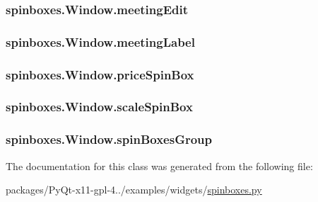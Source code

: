 \subsubsection[{meeting\+Edit}]{\setlength{\rightskip}{0pt plus 5cm}spinboxes.\+Window.\+meeting\+Edit}\label{classspinboxes_1_1Window_a54ce7dc97045e27e06d113a56c515d79}
\hypertarget{classspinboxes_1_1Window_af187cb704e7fd78f2927aeb3847082ae}{}
\subsubsection[{meeting\+Label}]{\setlength{\rightskip}{0pt plus 5cm}spinboxes.\+Window.\+meeting\+Label}\label{classspinboxes_1_1Window_af187cb704e7fd78f2927aeb3847082ae}
\hypertarget{classspinboxes_1_1Window_a227b296cc92b6c5fc1293befa287a1bb}{}
\subsubsection[{price\+Spin\+Box}]{\setlength{\rightskip}{0pt plus 5cm}spinboxes.\+Window.\+price\+Spin\+Box}\label{classspinboxes_1_1Window_a227b296cc92b6c5fc1293befa287a1bb}
\hypertarget{classspinboxes_1_1Window_a6e119932d097ec9b15cb3cff46e4a886}{}
\subsubsection[{scale\+Spin\+Box}]{\setlength{\rightskip}{0pt plus 5cm}spinboxes.\+Window.\+scale\+Spin\+Box}\label{classspinboxes_1_1Window_a6e119932d097ec9b15cb3cff46e4a886}
\hypertarget{classspinboxes_1_1Window_adcdb190cbc4af5ffb0192ddd85e11f49}{}
\subsubsection[{spin\+Boxes\+Group}]{\setlength{\rightskip}{0pt plus 5cm}spinboxes.\+Window.\+spin\+Boxes\+Group}\label{classspinboxes_1_1Window_adcdb190cbc4af5ffb0192ddd85e11f49}


The documentation for this class was generated from the following file\+:\begin{DoxyCompactItemize}
\item 
packages/\+Py\+Qt-\/x11-\/gpl-\/4../examples/widgets/\hyperlink{spinboxes_8py}{spinboxes.\+py}\end{DoxyCompactItemize}
